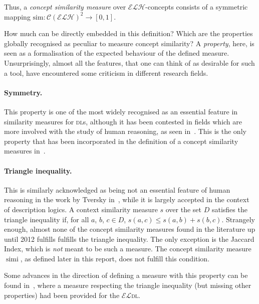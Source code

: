 \documentclass[]{llncs}
\DeclareMathOperator{\simi}{simi}
\newcommand{\el}{\(\mathcal{EL}\)\xspace}
\newcommand{\elh}{\(\mathcal{ELH}\)\xspace}
\newcommand{\dl}{\textsc{dl}\xspace}
\begin{document}
  Thus, a \emph{concept similarity measure} over \elh-concepts consists of a symmetric mapping \(\mathrm{sim} \colon {\mathcal{C}(\mathcal{ELH})}^2 \to [0,1]\).

  How much can be directly embedded in this definition?
  Which are the properties globally recognised as peculiar to measure concept similarity?
  A \emph{property}, here, is seen as a formalisation of the expected behaviour of the defined measure.
  Unsurprisingly, almost all the features, that one can think of as desirable for such a tool, have encountered some criticism in different research fields.

  \paragraph{Symmetry.} This property is one of the most widely recognised as an essential feature in similarity measures for \dl{}s, although it has been contested in fields which are more involved with the study of human reasoning, as seen in~\cite{Tve77}.
  This is the only property that has been incorporated in the definition of a concept similarity measures in~\cite{LeTu12}.

  \paragraph{Triangle inequality.} This is similarly acknowledged as being not an essential feature of human reasoning in the work by Tversky in~\cite{Tve77}, while it is largely accepted in the context of description logics.
  A context similarity measure \(s\) over the set \(D\) satisfies the triangle inequality if, for all \(a\), \(b\), \(c \in D\),
  \(s(a,c) \le s(a,b) + s(b,c)\).
  Strangely enough, almost none of the concept similarity measures found in the literature up until 2012 fulfills fulfills the triangle inequality.
  The only exception is the Jaccard Index, which is \emph{not} meant to be such a measure.
  The concept similarity measure \(\simi\), as defined later in this report, does not fulfill this condition.

  Some advances in the direction of defining a measure with this property can be found in~\cite{DAB14}, where a measure respecting the triangle inequality (but missing other properties) had been provided for the \el \dl.
\end{document}
